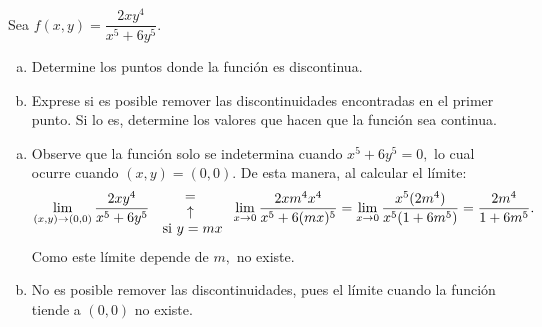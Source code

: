 \begin{prob}
Sea $f(x,y)=\dfrac{2xy^4}{x^5+6y^5}.$
\begin{enumerate}[(a)]
    \item Determine los puntos donde la función es discontinua.
    \item Exprese si es posible remover las discontinuidades encontradas en el primer punto. Si lo es, determine los valores que hacen que la función sea continua. 
\end{enumerate}
\begin{myproof}
\begin{enumerate}[(a)]
\item Observe que la función solo se indetermina cuando $x^5+6y^5=0,$ lo cual ocurre cuando $(x,y)=(0,0).$ De esta manera, al calcular el límite:
 \begin{align*}
\displaystyle\lim_{(x,y)\to (0,0)} \dfrac{2xy^4}{x^5+6y^5} {{=}\atop {\begin{array}{c}
\uparrow\\ \text{ si $y=mx$}\end{array}} } \displaystyle\lim_{x\to 0}\dfrac{2xm^4x^4}{x^5+6(mx)^5}=\displaystyle\lim_{x\to 0}\dfrac{x^5(2m^4)}{x^5(1+6m^5)}=\displaystyle\dfrac{2m^4}{1+6m^5}.
\end{align*}
Como este límite depende de $m,$ no existe.
\item No es posible remover las discontinuidades, pues el límite cuando la función tiende a $(0,0)$ no existe.
\end{enumerate}
\end{myproof}
\end{prob}


